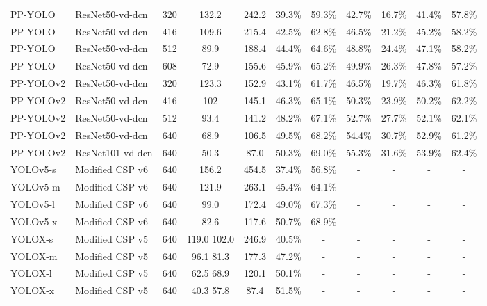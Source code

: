 \documentclass[final]{cvpr}
\begin{document}
\begin{table*}[ht]
{\begin{tabular}{l|l|c|cc|cccccc}
				\hline
				PP-YOLO~\cite{long2020pp} & ResNet50-vd-dcn & 320 & 132.2 &  242.2 & 39.3\% & 59.3\% & 42.7\% & 16.7\% & 41.4\% & 57.8\% \\
				PP-YOLO~\cite{long2020pp} & ResNet50-vd-dcn & 416 & 109.6 & 215.4 & 42.5\% & 62.8\% & 46.5\% & 21.2\% & 45.2\% & 58.2\% \\
				PP-YOLO~\cite{long2020pp} & ResNet50-vd-dcn & 512 & 89.9 & 188.4 & 44.4\%  & 64.6\% & 48.8\% & 24.4\% & 47.1\% & 58.2\% \\
				PP-YOLO~\cite{long2020pp}& ResNet50-vd-dcn & 608 & 72.9 &  155.6 & 45.9\% & 65.2\% & 49.9\% & 26.3\% & 47.8\% & 57.2\% \\
				
				\hline
				PP-YOLOv2 \cite{huang2021pp-yolov2} & ResNet50-vd-dcn & 320 & 123.3 & 152.9 & 43.1\% & 61.7\% & 46.5\% & 19.7\% & 46.3\% & 61.8\% \\
				PP-YOLOv2 \cite{huang2021pp-yolov2} & ResNet50-vd-dcn & 416 & 102 & 145.1 & 46.3\% & 65.1\% & 50.3\% & 23.9\% & 50.2\% & 62.2\% \\
				PP-YOLOv2 \cite{huang2021pp-yolov2} & ResNet50-vd-dcn & 512 & 93.4 &  141.2 & 48.2\% & 67.1\% & 52.7\% & 27.7\% & 52.1\% & 62.1\% \\
				PP-YOLOv2 \cite{huang2021pp-yolov2} & ResNet50-vd-dcn & 640 & 68.9 & 106.5 & 49.5\% & 68.2\% & 54.4\% & 30.7\% & 52.9\% & 61.2\% \\
				PP-YOLOv2 \cite{huang2021pp-yolov2} & ResNet101-vd-dcn & 640 & 50.3 &  87.0 & 50.3\% & 69.0\% & 55.3\% & 31.6\% & 53.9\% & 62.4\% \\
				
				\hline
				YOLOv5-s \cite{glenn_jocher_2022_6222936} & Modified CSP v6 & 640 & 156.2 & 454.5 & 37.4\% & 56.8\% & - & - & - & - \\
				YOLOv5-m \cite{glenn_jocher_2022_6222936} & Modified CSP v6 & 640 & 121.9 & 263.1 & 45.4\% & 64.1\% & - & - & - & - \\
				YOLOv5-l \cite{glenn_jocher_2022_6222936} & Modified CSP v6 & 640 & 99.0 & 172.4 & 49.0\%  & 67.3\% & - & - & - & - \\
				YOLOv5-x \cite{glenn_jocher_2022_6222936} & Modified CSP v6 & 640 & 82.6 & 117.6 & 50.7\% & 68.9\% & - & - & - & - \\
				


				\hline
				YOLOX-s \cite{ge2021yolox} & Modified CSP v5 & 640 & 119.0  102.0  & 246.9 & 40.5\% & - & - & - & - & - \\
				YOLOX-m \cite{ge2021yolox}& Modified CSP v5 & 640 & 96.1  81.3 & 177.3 & 47.2\% & - & - & - & - & - \\
				YOLOX-l \cite{ge2021yolox}& Modified CSP v5 & 640 & 62.5  68.9  & 120.1 & 50.1\% & - & - & - & - & - \\
				YOLOX-x \cite{ge2021yolox}& Modified CSP v5 & 640 & 40.3  57.8 & 87.4  & 51.5\% & - & - & - & - & - \\
				

\end{tabular}}
\end{table*}
\end{document}
